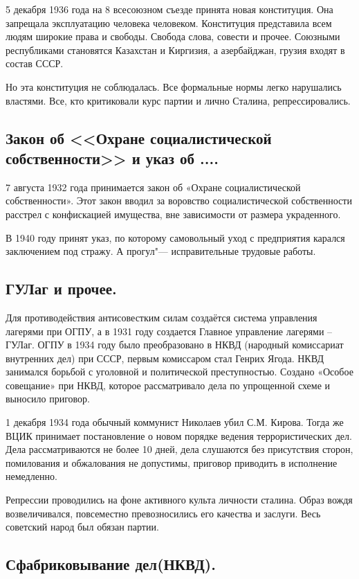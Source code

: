 5 декабря 1936 года на 8 всесоюзном съезде принята новая конституция. Она запрещала эксплуатацию человека человеком. Конституция представила всем людям широкие права и свободы. Свобода слова, совести и прочее. Союзными республиками становятся Казахстан и Киргизия, а азербайджан, грузия входят в состав СССР.

Но эта конституция не соблюдалась. Все формальные нормы легко нарушались властями. Все, кто критиковали курс партии и лично Сталина, репрессировались.

\subsection{Закон об <<Охране социалистической собственности>> и указ об ....}

7 августа 1932 года принимается закон об «Охране социалистической собственности». Этот закон вводил за воровство социалистической собственности расстрел с конфискацией имущества, вне зависимости от размера украденного.

В 1940 году принят указ, по которому самовольный уход с предприятия карался заключением под стражу. А прогул"--- исправительные трудовые работы.

\subsection{ГУЛаг и прочее.}

Для противодействия антисовестким силам создаётся система управления лагерями при ОГПУ, а в 1931 году создается Главное управление лагерями – ГУЛаг. ОГПУ в 1934 году было преобразовано в НКВД (народный комиссариат внутренних дел) при СССР, первым комиссаром стал Генрих Ягода. НКВД занимался борьбой с уголовной и политической преступностью. Создано «Особое совещание» при НКВД, которое рассматривало дела по упрощенной схеме и выносило приговор.

1 декабря 1934 года обычный коммунист Николаев убил С.М. Кирова. Тогда же ВЦИК принимает постановление о новом порядке ведения террористических дел. Дела рассматриваются не более 10 дней, дела слушаются без присутствия сторон, помилования и обжалования не допустимы, приговор приводить в исполнение немедленно.

Репрессии проводились на фоне активного культа личности сталина. Образ вождя возвеличивался, повсеместно превозносились его качества и заслуги. Весь советский народ был обязан партии.

\subsection{Сфабриковывание дел(НКВД).}

